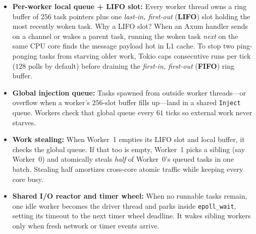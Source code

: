 \begin{itemize}
  \item \textbf{Per-worker local queue + LIFO slot:} Every worker thread owns a ring buffer of $256$ task pointers plus one \emph{last-in, first-out} (\textbf{LIFO}) slot holding the most recently woken task. Why a LIFO slot? When an Axum handler sends on a channel or wakes a parent task, running the woken task \emph{next} on the same CPU core finds the message payload hot in L1 cache. To stop two ping-ponging tasks from starving older work, Tokio caps consecutive runs per tick ($128$ polls by default) before draining the \emph{first-in, first-out} (\textbf{FIFO}) ring buffer.
  \item \textbf{Global injection queue:} Tasks spawned from outside worker threads---or overflow when a worker's $256$-slot buffer fills up---land in a shared \texttt{Inject} queue. Workers check that global queue every $61$ ticks so external work never starves.
  \item \textbf{Work stealing:} When Worker~1 empties its LIFO slot and local buffer, it checks the global queue. If that too is empty, Worker~1 picks a sibling (say Worker~0) and atomically steals \emph{half} of Worker~0's queued tasks in one batch. Stealing half amortizes cross-core atomic traffic while keeping every core busy.
  \item \textbf{Shared I/O reactor and timer wheel:} When no runnable tasks remain, one idle worker becomes the driver thread and parks inside \texttt{epoll\_wait}, setting its timeout to the next timer wheel deadline. It wakes sibling workers only when fresh network or timer events arrive.
\end{itemize}

